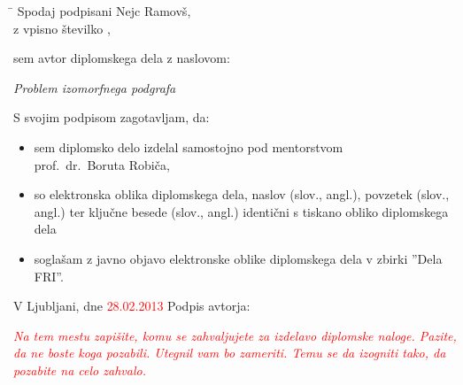 \documentclass[a4paper, 12pt, ]{book}
\newcommand{\TODO}[1]{\textcolor{red}{#1}}
\newcommand{\clearemptydoublepage}{\newpage{\pagestyle{empty}\cleardoublepage}}
\begin{document}
	\vspace{1cm}
	
	\begin{tabbing}
	\hspace*{4cm}\= \kill
	Spodaj podpisani \> Nejc Ramovš,  \\[0.3cm]
	z vpisno številko , \\
	\end{tabbing}
	
	\noindent sem avtor  diplomskega dela z naslovom:
	 
	
	\vspace{0.5cm}
	\emph{Problem izomorfnega podgrafa}
	
	\vspace{1.5cm}
	\noindent S svojim podpisom zagotavljam, da:
	\begin{itemize}
		\item sem diplomsko delo izdelal samostojno pod mentorstvom\\ prof.~dr.~Boruta Robiča,
	
		\item	so elektronska oblika diplomskega dela, naslov (slov., angl.), povzetek (slov., angl.) ter 
		ključne besede (slov., angl.) identični s tiskano obliko diplomskega dela

		\item soglašam z javno objavo elektronske oblike diplomskega dela v zbirki ''Dela FRI''.
	\end{itemize}
	
	\vspace{1cm}
	\noindent V Ljubljani, dne \TODO{28.02.2013} \hspace{3cm} Podpis avtorja:
	
	\clearemptydoublepage
	
	
	
	
	\thispagestyle{empty}\mbox{}\vfill\null\it%
	\TODO {Na tem mestu zapišite, komu se zahvaljujete za izdelavo diplomske naloge. Pazite, da ne
	boste koga pozabili. Utegnil vam bo zameriti. Temu se da izogniti tako, da pozabite na celo zahvalo.}
	\rm\normalfont
	
	\clearemptydoublepage
	
	
	\def\thepage{}%
	\tableofcontents{}
	
	\clearemptydoublepage
	
\end{document}
